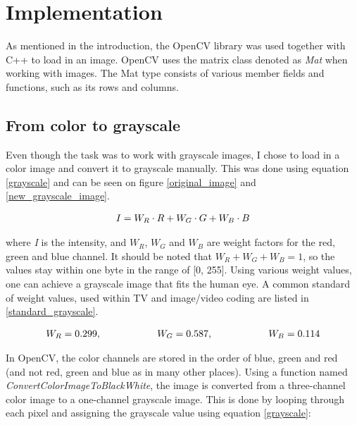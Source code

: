 \chapter{Implementation}
As mentioned in the introduction, the OpenCV library was used together with C++ to load in an image. OpenCV uses the matrix class denoted as \textit{Mat} when working with images. The Mat type consists of various member fields and functions, such as its rows and columns.

\section{From color to grayscale}
Even though the task was to work with grayscale images, I chose to load in a color image and convert it to grayscale manually. This was done using equation \ref{grayscale} and can be seen on figure \ref{original_image} and \ref{new_grayscale_image}.

\begin{align}
I = W_R \cdot R+W_G \cdot G+W_B \cdot B
\label{grayscale}
\end{align}

where \textit{I} is the intensity, and $W_R$, $W_G$ and $W_B$ are weight factors for the red, green and blue channel. It should be noted that $W_R + W_G + W_B = 1$, so the values stay within one byte in the range of [0, 255]. Using various weight values, one can achieve a grayscale image that fits the human eye. A common standard of weight values, used within TV and image/video coding are listed in \ref{standard_grayscale}. \citep{ip_book}

\begin{align}
W_R = 0.299, \hspace{20 mm} W_G = 0.587, \hspace{20 mm} W_B = 0.114
\label{standard_grayscale}
\end{align}

In OpenCV, the color channels are stored in the order of blue, green and red (and not red, green and blue as in many other places). Using a function named \textit{ConvertColorImageToBlackWhite}, the image is converted from a three-channel color image to a one-channel grayscale image. This is done by looping through each pixel and assigning the grayscale value using equation \ref{grayscale}:

